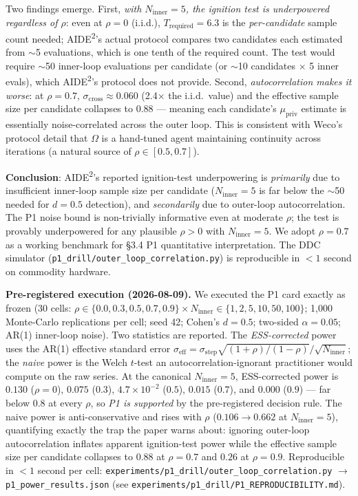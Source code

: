 Two findings emerge. First, \emph{with $N_{\text{inner}} = 5$, the ignition test is underpowered regardless of $\rho$}: even at $\rho = 0$ (i.i.d.), $T_{\text{required}} = 6.3$ is the \emph{per-candidate} sample count needed; AIDE\textsuperscript{2}'s actual protocol compares two candidates each estimated from $\sim$5 evaluations, which is one tenth of the required count. The test would require $\sim$50 inner-loop evaluations per candidate (or $\sim$10 candidates $\times$ 5 inner evals), which AIDE\textsuperscript{2}'s protocol does not provide. Second, \emph{autocorrelation makes it worse}: at $\rho = 0.7$, $\sigma_{\text{cross}} \approx 0.060$ (2.4$\times$ the i.i.d.\ value) and the effective sample size per candidate collapses to 0.88 --- meaning each candidate's $\mu_{\text{priv}}$ estimate is essentially noise-correlated across the outer loop. This is consistent with Weco's protocol detail that $\Omega$ is a hand-tuned agent maintaining continuity across iterations (a natural source of $\rho \in [0.5, 0.7]$).

\textbf{Conclusion}: AIDE\textsuperscript{2}'s reported ignition-test underpowering is \emph{primarily} due to insufficient inner-loop sample size per candidate ($N_{\text{inner}} = 5$ is far below the $\sim$50 needed for $d = 0.5$ detection), and \emph{secondarily} due to outer-loop autocorrelation. The P1 noise bound is non-trivially informative even at moderate $\rho$; the test is provably underpowered for any plausible $\rho > 0$ with $N_{\text{inner}} = 5$. We adopt $\rho = 0.7$ as a working benchmark for \S3.4 P1 quantitative interpretation. The DDC simulator (\texttt{p1\_drill/outer\_loop\_correlation.py}) is reproducible in $<1$ second on commodity hardware.

\textbf{Pre-registered execution (2026-08-09).} We executed the P1 card exactly as frozen (30 cells: $\rho \in \{0.0, 0.3, 0.5, 0.7, 0.9\} \times N_{\text{inner}} \in \{1, 2, 5, 10, 50, 100\}$; 1{,}000 Monte-Carlo replications per cell; seed 42; Cohen's $d = 0.5$; two-sided $\alpha = 0.05$; AR(1) inner-loop noise). Two statistics are reported. The \emph{ESS-corrected} power uses the AR(1) effective standard error $\sigma_{\text{eff}} = \sigma_{\text{step}} \sqrt{(1+\rho)/(1-\rho)} / \sqrt{N_{\text{inner}}}$; the \emph{naive} power is the Welch $t$-test an autocorrelation-ignorant practitioner would compute on the raw series. At the canonical $N_{\text{inner}} = 5$, ESS-corrected power is $0.130$ ($\rho=0$), $0.075$ ($0.3$), $4.7\times10^{-2}$ ($0.5$), $0.015$ ($0.7$), and $0.000$ ($0.9$) --- far below $0.8$ at every $\rho$, so \emph{P1 is supported} by the pre-registered decision rule. The naive power is anti-conservative and rises with $\rho$ ($0.106 \to 0.662$ at $N_{\text{inner}}=5$), quantifying exactly the trap the paper warns about: ignoring outer-loop autocorrelation inflates apparent ignition-test power while the effective sample size per candidate collapses to $0.88$ at $\rho=0.7$ and $0.26$ at $\rho=0.9$. Reproducible in $<1$ second per cell: \texttt{experiments/p1\_drill/outer\_loop\_correlation.py} $\rightarrow$ \texttt{p1\_power\_results.json} (see \texttt{experiments/p1\_drill/P1\_REPRODUCIBILITY.md}).

